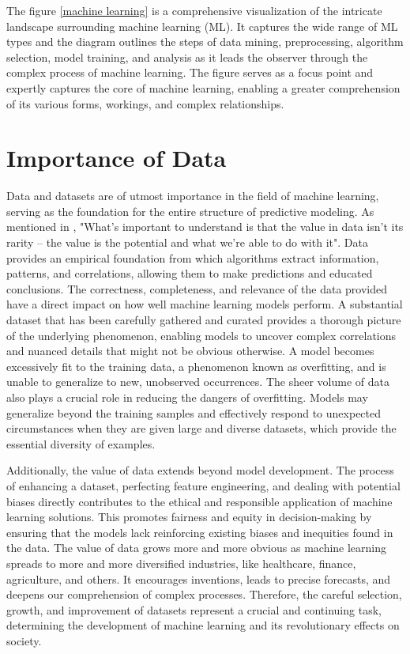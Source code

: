\documentclass[a4paper,12pt]{report}%
\renewcommand{\\}{\vspace*{0.5\baselineskip} \newline}
\begin{document}
\noindent The figure \ref{machine learning} is a comprehensive visualization of the intricate landscape surrounding machine learning (ML). It captures the wide range of ML types and the diagram outlines the steps of data mining, preprocessing, algorithm selection, model training, and analysis as it leads the observer through the complex process of machine learning. The figure serves as a focus point and expertly captures the core of machine learning, enabling a greater comprehension of its various forms, workings, and complex relationships.


\section{Importance of Data}
Data and datasets are of utmost importance in the field of machine learning, serving as the foundation for the entire structure of predictive modeling. As mentioned in \cite{44}, "What’s important to understand is that the value in data isn’t its rarity – the value is the potential and what we’re able to do with it".
Data provides an empirical foundation from which algorithms extract information, patterns, and correlations, allowing them to make predictions and educated conclusions. The correctness, completeness, and relevance of the data provided have a direct impact on how well machine learning models perform. A substantial dataset that has been carefully gathered and curated provides a thorough picture of the underlying phenomenon, enabling models to uncover complex correlations and nuanced details that might not be obvious otherwise.
A model becomes excessively fit to the training data, a phenomenon known as overfitting, and is unable to generalize to new, unobserved occurrences. The sheer volume of data also plays a crucial role in reducing the dangers of overfitting. Models may generalize beyond the training samples and effectively respond to unexpected circumstances when they are given large and diverse datasets, which provide the essential diversity of examples.

\noindent Additionally, the value of data extends beyond model development. The process of enhancing a dataset, perfecting feature engineering, and dealing with potential biases directly contributes to the ethical and responsible application of machine learning solutions. This promotes fairness and equity in decision-making by ensuring that the models lack reinforcing existing biases and inequities found in the data.
The value of data grows more and more obvious as machine learning spreads to more and more diversified industries, like healthcare, finance, agriculture, and others. It encourages inventions, leads to precise forecasts, and deepens our comprehension of complex processes. Therefore, the careful selection, growth, and improvement of datasets represent a crucial and continuing task, determining the development of machine learning and its revolutionary effects on society.
\end{document}
